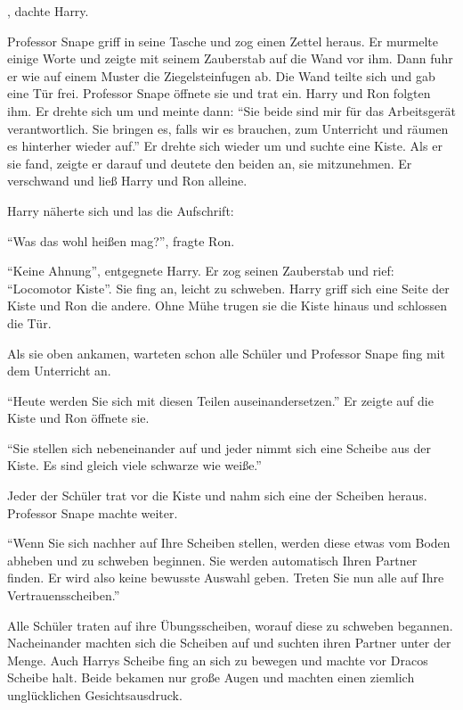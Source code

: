 , dachte Harry.

Professor Snape griff in seine Tasche und zog einen Zettel heraus. Er murmelte einige Worte und zeigte mit seinem Zauberstab auf die Wand vor ihm. Dann fuhr er wie auf einem Muster die Ziegelsteinfugen ab. Die Wand teilte sich und gab eine Tür frei. Professor Snape öffnete sie und trat ein. Harry und Ron folgten ihm. Er drehte sich um und meinte dann: \enquote{Sie beide sind mir für das Arbeitsgerät verantwortlich. Sie bringen es, falls wir es brauchen, zum Unterricht und räumen es hinterher wieder auf.} Er drehte sich wieder um und suchte eine Kiste. Als er sie fand, zeigte er darauf und deutete den beiden an, sie mitzunehmen. Er verschwand und ließ Harry und Ron alleine.

Harry näherte sich und las die Aufschrift: 

\enquote{Was das wohl heißen mag?}, fragte Ron.

\enquote{Keine Ahnung}, entgegnete Harry. Er zog seinen Zauberstab und rief: \enquote{Locomotor Kiste}. Sie fing an, leicht zu schweben. Harry griff sich eine Seite der Kiste und Ron die andere. Ohne Mühe trugen sie die Kiste hinaus und schlossen die Tür.

Als sie oben ankamen, warteten schon alle Schüler und Professor Snape fing mit dem Unterricht an.

\enquote{Heute werden Sie sich mit diesen Teilen auseinandersetzen.} Er zeigte auf die Kiste und Ron öffnete sie.

\enquote{Sie stellen sich nebeneinander auf und jeder nimmt sich eine Scheibe aus der Kiste. Es sind gleich viele schwarze wie weiße.}

Jeder der Schüler trat vor die Kiste und nahm sich eine der Scheiben heraus. Professor Snape machte weiter.

\enquote{Wenn Sie sich nachher auf Ihre Scheiben stellen, werden diese etwas vom Boden abheben und zu schweben beginnen. Sie werden automatisch Ihren Partner finden. Er wird also keine bewusste Auswahl geben. Treten Sie nun alle auf Ihre Vertrauensscheiben.}

Alle Schüler traten auf ihre Übungsscheiben, worauf diese zu schweben begannen. Nacheinander machten sich die Scheiben auf und suchten ihren Partner unter der Menge. Auch Harrys Scheibe fing an sich zu bewegen und machte vor Dracos Scheibe halt. Beide bekamen nur große Augen und machten einen ziemlich unglücklichen Gesichtsausdruck.

